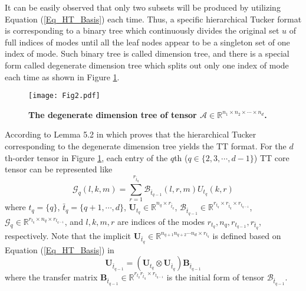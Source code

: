 \documentclass[a4paper,fleqn]{cas-dc}
\begin{document}
It can be easily observed that only two subsets will be produced by utilizing Equation (\ref{Eq_HT_Basis}) each time. Thus, a specific hierarchical Tucker format is corresponding to a binary tree which continuously divides the original set \( u \) of full indices of modes until all the leaf nodes appear to be a singleton set of one index of mode. Such binary tree is called dimension tree, and there is a special form called degenerate dimension tree which splits out only one index of mode each time as shown in Figure \ref{Fig_degenerate_tree}.

\begin{figure}
\centering
\texttt{[image: Fig2.pdf]}
\caption{\textbf{The degenerate dimension tree of tensor \(\bm{\mathcal{A}} \in \mathbb{R}^{n_1 \times n_2 \times \cdots \times n_d}\).}}
\label{Fig_degenerate_tree}
\end{figure}

According to Lemma 5.2 in \citet{Grasedyck_2010_InventHT} which proves that the hierarchical Tucker corresponding to the degenerate dimension tree yields the TT format. For the \(d\)th-order tensor in Figure \ref{Fig_degenerate_tree}, each entry of the \(q\)th (\(q \in \{2,3,\cdots,d-1\}\)) TT core tensor can be represented like
\begin{equation*}
\mathcal{G}_q(l,k,m) = \sum_{r=1}^{r_{\bar{t}_{q}}} \mathcal{B}_{\bar{t}_{q-1}}(l,r,m) U_{t_{q}}(k,r)
\end{equation*}
where \(t_{q} = \{q\}\), \(\bar{t}_{q} = \{q+1,\cdots,d\}\), \(\bm{U}_{t_{q}} \in \mathbb{R}^{n_{q} \times r_{\bar{t}_{q}}}\), \(\bm{\mathcal{B}}_{\bar{t}_{q-1}} \in \mathbb{R}^{r_{t_{q}} \times r_{\bar{t}_{q}} \times r_{t_{q-1}}}\), \(\bm{\mathcal{G}}_{q} \in \mathbb{R}^{r_{t_{q}} \times n_{q} \times r_{t_{q-1}}}\), and \(l,k,m,r\) are indices of the modes \(r_{t_{q}},n_{q},r_{t_{q-1}},r_{\bar{t}_{q}}\), respectively. Note that the implicit \(\bm{U}_{\bar{t}_{q}} \in \mathbb{R}^{n_{q+1}n_{q+2} \cdots n_{d} \times r_{t_{q}}}\) is defined based on Equation (\ref{Eq_HT_Basis}) in
\begin{equation*}
\bm{U}_{\bar{t}_{q-1}} = (\bm{U}_{t_{q}} \otimes \bm{U}_{\bar{t}_{q}}) \bm{B}_{\bar{t}_{q-1}}
\end{equation*}
where the transfer matrix \(\bm{B}_{\bar{t}_{q-1}} \in \mathbb{R}^{r_{t_{q}}r_{\bar{t}_{q}} \times r_{t_{q-1}}}\) is the initial form of tensor \(\bm{\mathcal{B}}_{\bar{t}_{q-1}}\).
\end{document}
